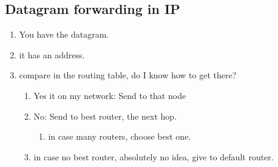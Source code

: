 \documentclass[12pt]{book}
\begin{document}
\subsection{Datagram forwarding in IP}
\begin{enumerate}
    \item You have the datagram.
    \item it has an address.
    \item compare in the routing table, do I know how to get there?
    \begin{enumerate}
        \item Yes it on my network: Send to that node
        \item No: Send to best router, the next hop.
        \begin{enumerate}
            \item in case many routers, choose best one.
        \end{enumerate}
        \item in case no best router, absolutely no idea, give to default router.
    \end{enumerate}
\end{enumerate}
\end{document}
